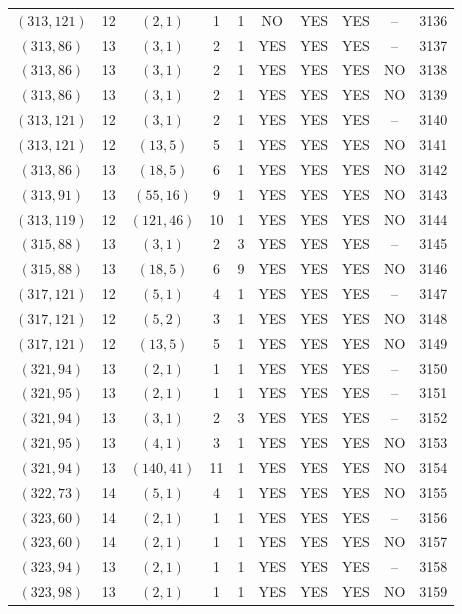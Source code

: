 \begin{longtable}{|c|c|c|c|c|c|c|c|c|c|}
$(313, 121)$ & 12 & $(2, 1)$ & 1 & 1 & NO & YES & YES & -- & 3136\\
$(313, 86)$ & 13 & $(3, 1)$ & 2 & 1 & YES & YES & YES & -- & 3137\\
$(313, 86)$ & 13 & $(3, 1)$ & 2 & 1 & YES & YES & YES & NO & 3138\\
$(313, 86)$ & 13 & $(3, 1)$ & 2 & 1 & YES & YES & YES & NO & 3139\\
$(313, 121)$ & 12 & $(3, 1)$ & 2 & 1 & YES & YES & YES & -- & 3140\\
$(313, 121)$ & 12 & $(13, 5)$ & 5 & 1 & YES & YES & YES & NO & 3141\\
$(313, 86)$ & 13 & $(18, 5)$ & 6 & 1 & YES & YES & YES & NO & 3142\\
$(313, 91)$ & 13 & $(55, 16)$ & 9 & 1 & YES & YES & YES & NO & 3143\\
$(313, 119)$ & 12 & $(121, 46)$ & 10 & 1 & YES & YES & YES & NO & 3144\\
$(315, 88)$ & 13 & $(3, 1)$ & 2 & 3 & YES & YES & YES & -- & 3145\\
$(315, 88)$ & 13 & $(18, 5)$ & 6 & 9 & YES & YES & YES & NO & 3146\\
$(317, 121)$ & 12 & $(5, 1)$ & 4 & 1 & YES & YES & YES & -- & 3147\\
$(317, 121)$ & 12 & $(5, 2)$ & 3 & 1 & YES & YES & YES & NO & 3148\\
$(317, 121)$ & 12 & $(13, 5)$ & 5 & 1 & YES & YES & YES & NO & 3149\\
$(321, 94)$ & 13 & $(2, 1)$ & 1 & 1 & YES & YES & YES & -- & 3150\\
$(321, 95)$ & 13 & $(2, 1)$ & 1 & 1 & YES & YES & YES & -- & 3151\\
$(321, 94)$ & 13 & $(3, 1)$ & 2 & 3 & YES & YES & YES & -- & 3152\\
$(321, 95)$ & 13 & $(4, 1)$ & 3 & 1 & YES & YES & YES & NO & 3153\\
$(321, 94)$ & 13 & $(140, 41)$ & 11 & 1 & YES & YES & YES & NO & 3154\\
$(322, 73)$ & 14 & $(5, 1)$ & 4 & 1 & YES & YES & YES & NO & 3155\\
$(323, 60)$ & 14 & $(2, 1)$ & 1 & 1 & YES & YES & YES & -- & 3156\\
$(323, 60)$ & 14 & $(2, 1)$ & 1 & 1 & YES & YES & YES & NO & 3157\\
$(323, 94)$ & 13 & $(2, 1)$ & 1 & 1 & YES & YES & YES & -- & 3158\\
$(323, 98)$ & 13 & $(2, 1)$ & 1 & 1 & YES & YES & YES & NO & 3159\\

\end{longtable}
